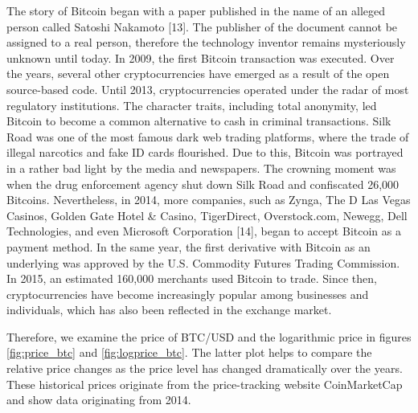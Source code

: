 \documentclass[
]{article}
\begin{document}
The story of Bitcoin began with a paper published in the name of an
alleged person called Satoshi Nakamoto {[}13{]}. The publisher of the
document cannot be assigned to a real person, therefore the technology
inventor remains mysteriously unknown until today. In 2009, the first
Bitcoin transaction was executed. Over the years, several other
cryptocurrencies have emerged as a result of the open source-based code.
Until 2013, cryptocurrencies operated under the radar of most regulatory
institutions. The character traits, including total anonymity, led
Bitcoin to become a common alternative to cash in criminal transactions.
Silk Road was one of the most famous dark web trading platforms, where
the trade of illegal narcotics and fake ID cards flourished. Due to
this, Bitcoin was portrayed in a rather bad light by the media and
newspapers. The crowning moment was when the drug enforcement agency
shut down Silk Road and confiscated 26,000 Bitcoins. Nevertheless, in
2014, more companies, such as Zynga, The D Las Vegas Casinos, Golden
Gate Hotel \& Casino, TigerDirect, Overstock.com, Newegg, Dell
Technologies, and even Microsoft Corporation {[}14{]}, began to accept
Bitcoin as a payment method. In the same year, the first derivative with
Bitcoin as an underlying was approved by the U.S. Commodity Futures
Trading Commission. In 2015, an estimated 160,000 merchants used Bitcoin
to trade. Since then, cryptocurrencies have become increasingly popular
among businesses and individuals, which has also been reflected in the
exchange market.

Therefore, we examine the price of BTC/USD and the logarithmic price in
figures \ref{fig:price_btc} and \ref{fig:logprice_btc}. The latter plot
helps to compare the relative price changes as the price level has
changed dramatically over the years. These historical prices originate
from the price-tracking website CoinMarketCap and show data originating
from 2014.
\end{document}
